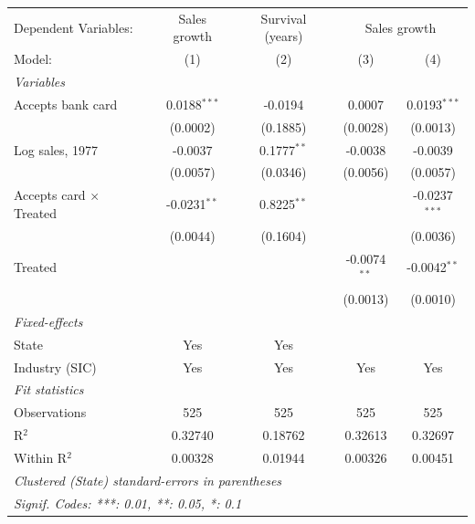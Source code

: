 \begingroup
\centering
\begin{tabular}{lcccc}
   \tabularnewline \midrule \midrule
   Dependent Variables: & Sales growth & Survival (years) & \multicolumn{2}{c}{Sales growth}\\
   Model:                       & (1)            & (2)           & (3)            & (4)\\  
   \midrule
   \emph{Variables}\\
   Accepts bank card                   & 0.0188$^{***}$ & -0.0194       & 0.0007         & 0.0193$^{***}$\\   
                                & (0.0002)       & (0.1885)      & (0.0028)       & (0.0013)\\   
   Log sales, 1977                  & -0.0037        & 0.1777$^{**}$ & -0.0038        & -0.0039\\   
                                & (0.0057)       & (0.0346)      & (0.0056)       & (0.0057)\\   
   Accepts card $\times$ Treated  & -0.0231$^{**}$ & 0.8225$^{**}$ &                & -0.0237$^{***}$\\   
                                & (0.0044)       & (0.1604)      &                & (0.0036)\\   
   Treated                      &                &               & -0.0074$^{**}$ & -0.0042$^{**}$\\   
                                &                &               & (0.0013)       & (0.0010)\\   
   \midrule
   \emph{Fixed-effects}\\
   State                        & Yes            & Yes           &                & \\  
   Industry (SIC)                         & Yes            & Yes           & Yes            & Yes\\  
   \midrule
   \emph{Fit statistics}\\
   Observations                 & 525            & 525           & 525            & 525\\  
   R$^2$                        & 0.32740        & 0.18762       & 0.32613        & 0.32697\\  
   Within R$^2$                 & 0.00328        & 0.01944       & 0.00326        & 0.00451\\  
   \midrule \midrule
   \multicolumn{5}{l}{\emph{Clustered (State) standard-errors in parentheses}}\\
   \multicolumn{5}{l}{\emph{Signif. Codes: ***: 0.01, **: 0.05, *: 0.1}}\\
\end{tabular}
\par\endgroup

